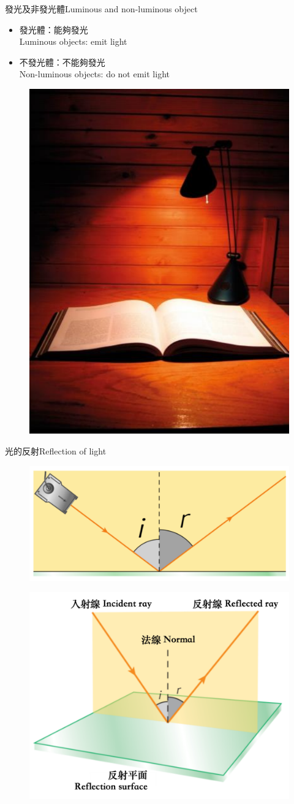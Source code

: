 \documentclass[beamer=true]{standalone}
\begin{document}
\begin{frame}{發光及非發光體Luminous and non-luminous object}
    \begin{itemize}
        \item 發光體：能夠發光\\Luminous objects: emit light
        \item 不發光體：不能夠發光\\Non-luminous objects: do not emit light
    \end{itemize}\bigskip
    \begin{figure}
        \centering
        \includegraphics[width=0.25\linewidth]{assets/deowjdjdoijoidjowdqwp.png}
    \end{figure}
\end{frame}

\begin{frame}{光的反射Reflection of light}
    \begin{figure}
        \centering
        \includegraphics[width=0.45\linewidth]{assets/djoiqdqwiodijqwodage.png}
        
    \end{figure}
    \begin{figure}
        \centering
        \includegraphics[width=0.58\linewidth]{assets/qdqwdiwqoe.png}
        
        
    \end{figure}
    
\end{frame}
\end{document}
